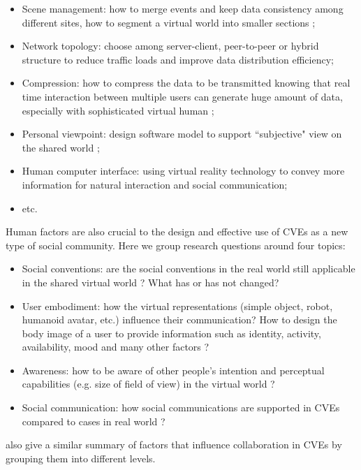 \begin{itemize}
\item Scene management: how to merge events and keep data consistency among different sites, how to segment a virtual world into smaller sections \citep{Kazman1993Making};
\item Network topology: choose among server-client, peer-to-peer or hybrid structure to reduce traffic loads and improve data distribution efficiency;
\item Compression: how to compress the data to be transmitted knowing that real time interaction between multiple users can generate huge amount of data, especially with sophisticated virtual human \citep{Capin1998Efficient};
\item Personal viewpoint: design software model to support ``subjective" view on the shared world \citep{Smith1996CVE};
\item Human computer interface: using virtual reality technology to convey more information for natural interaction and social communication;
\item etc.
\end{itemize}

Human factors are also crucial to the design and effective use of CVEs as a new type of social community. Here we group research questions around four topics: 

\begin{itemize}
\item Social conventions: are the social conventions in the real world still applicable in the shared virtual world \citep{Becker1998Social}? What has or has not changed?
\item User embodiment: how the virtual representations (simple object, robot, humanoid avatar, etc.) influence their communication? How to design the body image of a user to provide information such as identity, activity, availability, mood and many other factors \citep{Benford1995Embodiment}? 
\item Awareness: how to be aware of other people's intention and perceptual capabilities (e.g. size of field of view) in the virtual world \citep{Benford1994Awareness}?
\item Social communication: how social communications are supported in CVEs compared to cases in real world \citep{Bailenson2006Long}?
\end{itemize}

\citet{Otto2006Review} also give a similar summary of factors that influence collaboration in CVEs by grouping them into different levels.


